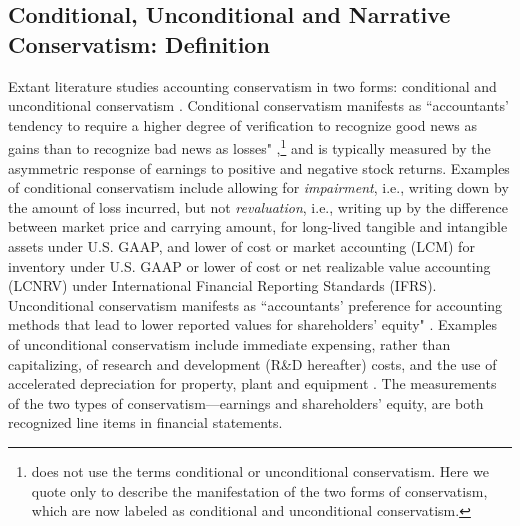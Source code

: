 \documentclass[a4paper]{article}
\begin{document}
\begin{spacing}{2}
\subsection{Conditional, Unconditional and Narrative Conservatism: Definition}
Extant literature studies accounting conservatism in two forms: conditional and unconditional conservatism \cite{beaverConditionalUnconditionalConservatism2005}. Conditional conservatism manifests as ``accountants' tendency to require a higher degree of verification to recognize good news as gains than to recognize bad news as losses" ,\footnote{ does not use the terms conditional or unconditional conservatism. Here we quote  only to describe the manifestation of the two forms of conservatism, which are now labeled as conditional and unconditional conservatism.} and is typically measured by the asymmetric response of earnings to positive and negative stock returns. Examples of conditional conservatism include allowing for \textit{impairment}, i.e., writing down by the amount of loss incurred, but not \textit{revaluation}, i.e., writing up by the difference between market price and carrying amount, for long-lived tangible and intangible assets under U.S. GAAP, and lower of cost or market accounting (LCM) for inventory under U.S. GAAP or lower of cost or net realizable value accounting (LCNRV) under International Financial Reporting Standards (IFRS). Unconditional conservatism manifests as ``accountants' preference for accounting methods that lead to lower reported values for shareholders' equity" . Examples of unconditional conservatism include immediate expensing, rather than capitalizing, of research and development (R\&D hereafter) costs, and the use of accelerated depreciation for property, plant and equipment . The measurements of the two types of conservatism---earnings and shareholders' equity, are both recognized line items in financial statements. %


\end{spacing}
\end{document}
